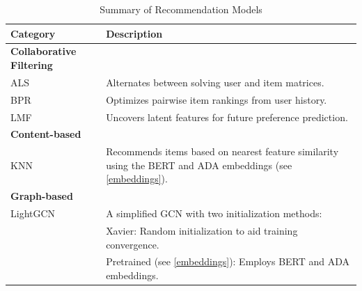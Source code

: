 \begin{table}[htbp]
\caption{Summary of Recommendation Models}
\label{tab:model-summary}
\begin{tabularx}{\columnwidth}{lX}
\toprule
\textbf{Category} & \textbf{Description} \\
\midrule
\textbf{Collaborative Filtering} & \\
ALS \cite{als1, als2} & Alternates between solving user and item matrices. \\
BPR \cite{bpr} & Optimizes pairwise item rankings from user history. \\
LMF \cite{lmf} & Uncovers latent features for future preference prediction. \\
\midrule
\textbf{Content-based} & \\
KNN & Recommends items based on nearest feature similarity using the BERT and ADA embeddings (see \autoref{embeddings}). \\
\midrule
\textbf{Graph-based} & \\
LightGCN \cite{lightgcn} & A simplified GCN with two initialization methods: \\
 & Xavier: Random initialization to aid training convergence. \\
 & Pretrained (see \autoref{embeddings}): Employs BERT and ADA embeddings. \\
\bottomrule
\end{tabularx}
\end{table}


